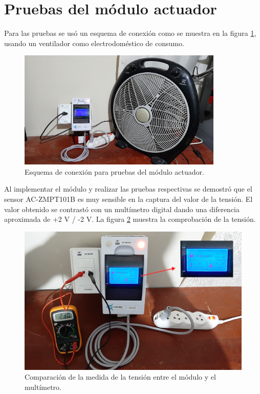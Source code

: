 \section{Pruebas del módulo actuador}
Para las pruebas se usó un esquema de conexión como se muestra en la figura \ref{fig:test-esquema}, usando un ventilador como electrodoméstico de consumo. 
\vspace{0.5cm}
\begin{figure}[htpb]
\centering 
\includegraphics[width=0.87\textwidth]{./Figures/test/consumo/esquema.png}
\caption{Esquema de conexión para pruebas del módulo actuador.}
\label{fig:test-esquema}
\end{figure}

Al implementar el módulo y realizar las pruebas respectivas se demostró que el sensor AC-ZMPT101B es muy sensible en la captura del valor de la tensión. El valor obtenido se contrastó con un multímetro digital dando una diferencia aproximada de +2 V / -2 V. La figura \ref{fig:test-tension} muestra la comprobación de la tensión.

\begin{figure}[htpb]
\centering 
\includegraphics[width=1.0\textwidth]{./Figures/test/consumo/tension2.png}
\caption{Comparación de la medida de la tensión entre el módulo y el multímetro.}
\label{fig:test-tension}
\end{figure}


